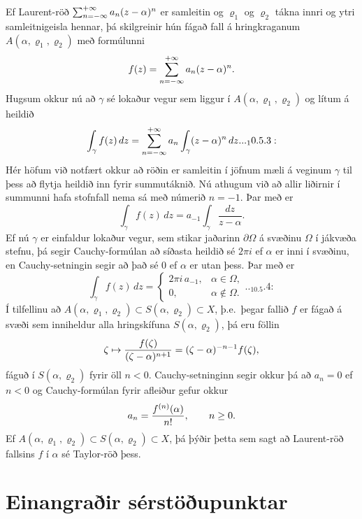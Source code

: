 Ef Laurent-röð $\sum_{n=-\infty}\sp{+\infty}a_n(z-\alpha)\sp n$ 
er samleitin og $\varrho_1$ og $\varrho_2$ tákna
innri og ytri samleitnigeisla hennar, þá skilgreinir hún fágað fall 
á hringkraganum
$A(\alpha,\varrho_1,\varrho_2)$ með formúlunni
 $$f(z)=\sum_{n=-\infty}\sp{+\infty}a_n(z-\alpha)\sp n.
 $$
Hugsum okkur nú að $\gamma$ sé lokaður vegur sem liggur í
$A(\alpha,\varrho_1,\varrho_2)$  og lítum á heildið
 \begin{equation*}\int_{\gamma} f(z)\, dz=
\sum_{n=-\infty}\sp{+\infty} a_n
\int_{\gamma} (z-\alpha)\sp n\, dz.


.. _10.5.3:

 \end{equation*}
Hér höfum við notfært okkur að röðin er samleitin í jöfnum mæli á
veginum $\gamma$ til þess að flytja heildið inn fyrir summutáknið. Nú
athugum við að allir liðirnir í summunni hafa stofnfall nema sá með
númerið $n=-1$.  Þar með er
 $$\int_{\gamma} f(z)\, dz=
a_{-1}
\int_{\gamma} \dfrac {dz}{z-\alpha}.
 $$
Ef nú $\gamma$ er einfaldur lokaður vegur, sem stikar jaðarinn
$\partial\Omega$ á svæðinu $\Omega$ í jákvæða stefnu, þá segir
Cauchy-formúlan að síðasta heildið sé $2\pi i$ ef $\alpha$ er inni í
svæðinu, en Cauchy-setningin segir að það sé $0$ ef $\alpha$ er utan
þess.  Þar með er
 \begin{equation*}\int_\gamma f(z) \, dz =\begin{cases}
2\pi i\, a_{-1}, &\alpha\in \Omega,\\
0, & \alpha\not\in \Omega.\end{cases}


.. _10.5.4:

 \end{equation*}
Í tilfellinu að $A(\alpha,\varrho_1,\varrho_2)\subset
S(\alpha,\varrho_2)\subset X$, þ.e.~þegar fallið 
$f$ er fágað á svæði sem inniheldur alla hringskífuna
$S(\alpha,\varrho_2)$, þá eru föllin
 $$\zeta\mapsto \dfrac
{f(\zeta)}{(\zeta-\alpha)\sp{n+1}}=(\zeta-\alpha)\sp{-n-1}f({\zeta}), 
 $$
fáguð í $S(\alpha,\varrho_2)$ fyrir öll $n<0$.  Cauchy-setninginn
segir okkur þá að $a_n=0$ ef $n<0$ og Cauchy-formúlan fyrir afleiður
gefur okkur
 $$a_n=\dfrac{f\sp{(n)}(\alpha)}{n!}, \qquad n\geq 0.
 $$
Ef $A(\alpha,\varrho_1,\varrho_2)\subset S(\alpha,\varrho_2)\subset X$,
þá  þýðir þetta sem sagt að Laurent-röð fallsins $f$ í ${\alpha}$ 
sé  Taylor-röð þess. 


\section{Einangraðir sérstöðupunktar}

